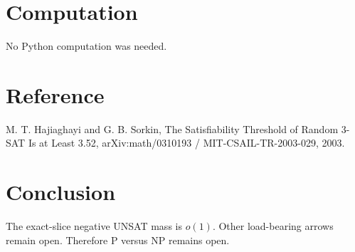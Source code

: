 \documentclass[11pt]{article}
\begin{document}
\section*{Computation}
No Python computation was needed.
\section*{Reference}
M. T. Hajiaghayi and G. B. Sorkin, The Satisfiability Threshold of Random 3-SAT Is at Least 3.52, arXiv:math/0310193 / MIT-CSAIL-TR-2003-029, 2003.
\section*{Conclusion}
The exact-slice negative UNSAT mass is $o(1)$. Other load-bearing arrows remain open. Therefore P versus NP remains open.
\end{document}

